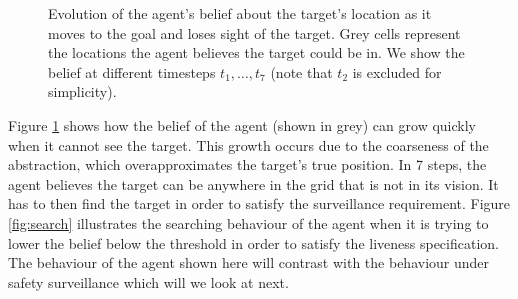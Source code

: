 \begin{figure}
\begin{minipage}{5.0cm}
\end{minipage}

	
	\caption{Evolution of the agent's belief about the target's location as it moves to the goal and loses sight of the target. Grey cells represent the locations the agent believes the target could be in. We show the belief at different timesteps $t_1,\ldots,t_7$ (note that $t_2$ is excluded for simplicity).
		}
	\label{fig:case1exp}
	
\end{figure}

Figure \ref{fig:case1exp} shows how the belief of the agent (shown in grey) can grow quickly when it cannot see the target. This growth occurs due to the coarseness of the abstraction, which overapproximates the target's true position. In 7 steps, the agent believes the target can be anywhere in the grid that is not in its vision. It has to then find the target in order to satisfy the surveillance requirement. Figure \ref{fig:search} illustrates the searching behaviour of the agent when it is trying to lower the belief below the threshold in order to satisfy the liveness specification. The behaviour of the agent shown here will contrast with the behaviour under safety surveillance which will we look at next.

